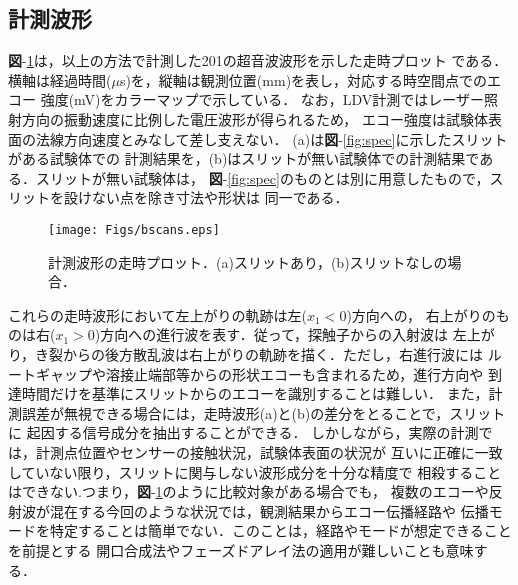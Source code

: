 \subsection{計測波形}
{\bf 図}-\ref{fig:bscans}は，以上の方法で計測した201の超音波波形を示した走時プロット
である．横軸は経過時間($\mu$s)を，縦軸は観測位置(mm)を表し，対応する時空間点でのエコー
強度(mV)をカラーマップで示している．
%
なお，LDV計測ではレーザー照射方向の振動速度に比例した電圧波形が得られるため，
エコー強度は試験体表面の法線方向速度とみなして差し支えない．
%
(a)は{\bf 図}-\ref{fig:spec}に示したスリットがある試験体での
計測結果を，(b)はスリットが無い試験体での計測結果である．スリットが無い試験体は，
{\bf 図}-\ref{fig:spec}のものとは別に用意したもので，スリットを設けない点を除き寸法や形状は
同一である．
\begin{figure}[bht]
\centering
	\texttt{[image: Figs/bscans.eps]}
	\caption{計測波形の走時プロット．(a)スリットあり，(b)スリットなしの場合．}
	\label{fig:bscans}
\end{figure}
これらの走時波形において左上がりの軌跡は左($x_1<0$)方向への，
右上がりのものは右($x_1>0$)方向への進行波を表す．従って，探触子からの入射波は
左上がり，き裂からの後方散乱波は右上がりの軌跡を描く．ただし，右進行波には
ルートギャップや溶接止端部等からの形状エコーも含まれるため，進行方向や
到達時間だけを基準にスリットからのエコーを識別することは難しい．
%
また，計測誤差が無視できる場合には，走時波形(a)と(b)の差分をとることで，スリットに
起因する信号成分を抽出することができる．
%
しかしながら，実際の計測では，計測点位置やセンサーの接触状況，試験体表面の状況が
互いに正確に一致していない限り，スリットに関与しない波形成分を十分な精度で
相殺することはできない.つまり，{\bf 図}-\ref{fig:bscans}のように比較対象がある場合でも，
複数のエコーや反射波が混在する今回のような状況では，観測結果からエコー伝播経路や
伝播モードを特定することは簡単でない．このことは，経路やモードが想定できることを前提とする
開口合成法やフェーズドアレイ法の適用が難しいことも意味する．


